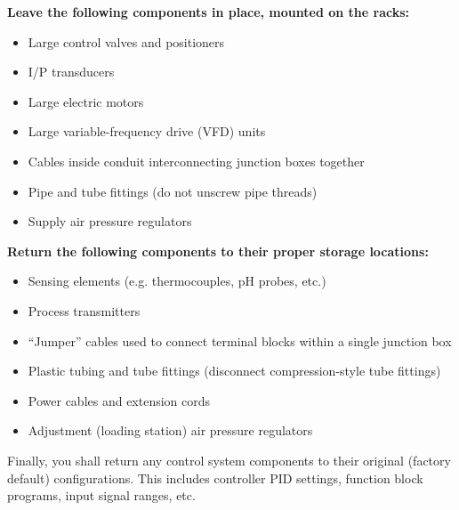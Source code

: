 \vskip 10pt

\indent
{\bf Leave the following components in place, mounted on the racks:}

\begin{itemize}
\item{} Large control valves and positioners
\item{} I/P transducers
\item{} Large electric motors
\item{} Large variable-frequency drive (VFD) units
\item{} Cables inside conduit interconnecting junction boxes together
\item{} Pipe and tube fittings (do not unscrew pipe threads)
\item{} Supply air pressure regulators
\end{itemize}

\vskip 10pt

\indent
{\bf Return the following components to their proper storage locations:}

\begin{itemize}
\item{} Sensing elements (e.g. thermocouples, pH probes, etc.)
\item{} Process transmitters
\item{} ``Jumper'' cables used to connect terminal blocks within a single junction box
\item{} Plastic tubing and tube fittings (disconnect compression-style tube fittings)
\item{} Power cables and extension cords
\item{} Adjustment (loading station) air pressure regulators
\end{itemize}

\vskip 10pt

Finally, you shall return any control system components to their original (factory default) configurations.  This includes controller PID settings, function block programs, input signal ranges, etc.

















